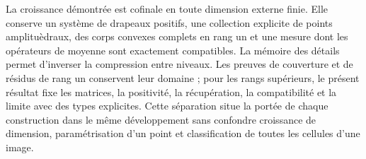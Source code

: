 La croissance démontrée est cofinale en toute dimension externe finie. Elle conserve un système de drapeaux positifs, une collection explicite de points amplituèdraux, des corps convexes complets en rang un et une mesure dont les opérateurs de moyenne sont exactement compatibles. La mémoire des détails permet d'inverser la compression entre niveaux. Les preuves de couverture et de résidus de rang un conservent leur domaine ; pour les rangs supérieurs, le présent résultat fixe les matrices, la positivité, la récupération, la compatibilité et la limite avec des types explicites. Cette séparation situe la portée de chaque construction dans le même développement sans confondre croissance de dimension, paramétrisation d'un point et classification de toutes les cellules d'une image.
